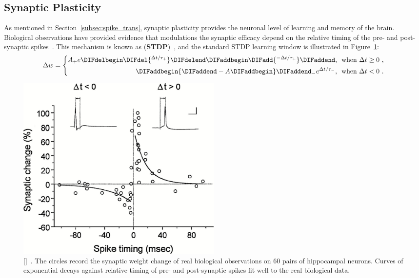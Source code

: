 \subsection{Synaptic Plasticity}
\label{subsec:STDP}
As mentioned in Section~\ref{subsec:spike_trans}, synaptic plasticity provides the neuronal level of learning and \DIFaddbegin {}\DIFaddend memory of the brain.
Biological observations have provided evidence that modulations \DIFdelbegin {}\DIFdelend \DIFaddbegin {}\DIFaddend the synaptic efficacy depend on the relative timing of the pre- and post-synaptic spikes~\citep{bi1998synaptic}.
This mechanism is known as \DIFdelbegin {}\DIFdelend \DIFaddbegin {}\DIFaddend (\textbf{STDP})~\citep{song2000competitive}, and the standard STDP learning window is illustrated in Figure~\ref{Fig:STDP}:
\begin{equation}
\Delta w = \left\{
\begin{aligned}
A_+ e\DIFdelbegin \DIFdel{^{\Delta t/\tau_+} }\DIFdelend \DIFaddbegin \DIFadd{^{-\Delta t/\tau_+} }\DIFaddend \textrm{,~~when~} \Delta t \geq 0~, \\
\DIFaddbegin {\DIFaddend -A\DIFaddbegin }\DIFaddend _- e^{\Delta t/\tau_-} \textrm{,~~when~} \Delta t < 0~.
\end{aligned}
\right.
\label{equ:stdp}
\end{equation}

\begin{figure}[bt!]
	\centering
	\includegraphics[width=0.5\textwidth]{pics_snn/stdp.jpeg}
	\caption{\DIFdelbeginFL {}\DIFdelendFL \DIFaddbeginFL {}[]\DIFaddendFL ~\citep{bi2001synaptic}.
	The circles record the synaptic weight change of real biological observations on 60 pairs of hippocampal neurons.
	Curves of exponential decays against relative timing of pre- and post-synaptic spikes fit well to the real biological data.
	}
	\label{Fig:STDP}
\end{figure}

